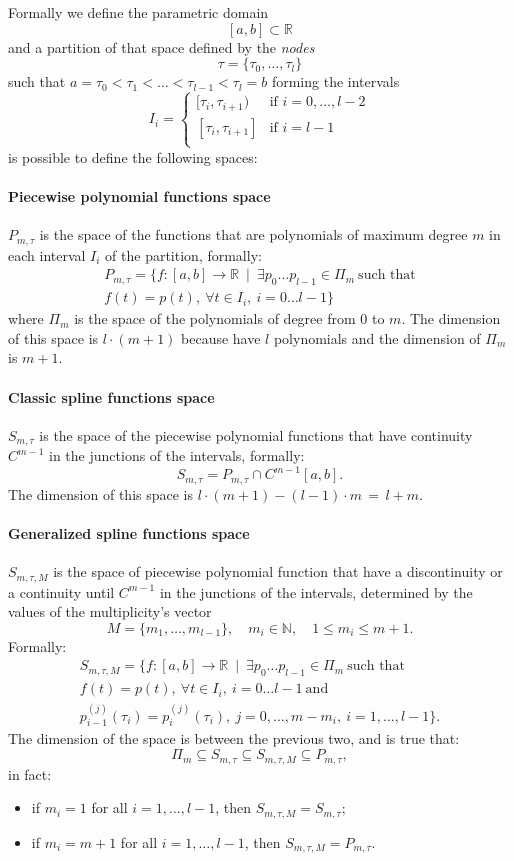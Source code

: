 \documentclass[a4paper]{article}
\newcommand{\mR}{\ensuremath{\mathbb{R}}}
\newcommand{\mN}{\ensuremath{\mathbb{N}}}
\begin{document}
Formally we define the parametric domain
$$[a,b]\subset\mR$$
and a partition of that space defined by the \emph{nodes}
$$\tau = \{\tau_0,\dots,\tau_l\}$$
such that $a=\tau_0<\tau_1<\dots<\tau_{l-1}<\tau_l=b$ forming the
intervals
$$
I_i=
\begin{cases}
  [\tau_i,\tau_{i+1}) & \mbox{if } i=0,\dots,l-2\\
    [\tau_i,\tau_{i+1}] & \mbox{if } i=l-1\\
\end{cases}
$$
is possible to define the following spaces:
\paragraph{Piecewise polynomial functions space} $P_{m,\tau}$
is the space of the functions that are polynomials of maximum degree $m$
in each interval $I_i$ of the partition, formally:
\begin{multline*}
  P_{m,\tau}=\{f:[a,b]\rightarrow\mR\ \mid\ \exists p_0\dots
  p_{l-1}\in\Pi_m \ \text{such that}\\
  f(t)=p(t),\ \forall t\in I_i,\
  i=0\dots l-1\}
\end{multline*}
where $\Pi_m$ is the space of the polynomials of degree from $0$ to
$m$. The dimension of this space is $l\cdot(m+1)$ because have $l$
polynomials and the dimension of $\Pi_m$ is $m+1$.
\paragraph{Classic spline functions space} $S_{m,\tau}$ is the space of
the piecewise polynomial functions that have continuity $C^{m-1}$ in
the junctions of the intervals, formally:
$$
S_{m,\tau}=P_{m,\tau}\cap C^{m-1}[a,b].
$$
The dimension of this space is $l\cdot(m+1)-(l-1)\cdot m\,=\,l+m$.
\paragraph{Generalized spline functions space} $S_{m,\tau,M}$ is the
space of piecewise polynomial function that have a discontinuity or a
continuity until $C^{m-1}$ in the junctions of the intervals,
determined by the values of the multiplicity's
vector
$$
M=\{m_1,\dots,m_{l-1}\},\quad m_i\in\mN,\quad 1\leq m_i\leq m+1.
$$
Formally:
\begin{multline*}
  S_{m,\tau,M}=\{f:[a,b]\rightarrow\mR\ \mid\ \exists p_0\dots
  p_{l-1}\in\Pi_m \ \text{such that}\\
  f(t)=p(t),\ \forall t\in I_i,\
  i=0\dots l-1\ \text{and}\\
  p_{i-1}^{(j)}(\tau_i)=p_{i}^{(j)}(\tau_i),\ j=0,\dots,m-m_i,\ i=1,\dots,l-1\}.
\end{multline*}
The dimension of the space is between the previous two, and is true
that:
$$
\Pi_m\subseteq S_{m,\tau}\subseteq S_{m,\tau,M}\subseteq P_{m,\tau},
$$
in fact:
\begin{itemize}
  \item if $m_i=1$ for all $i=1,\dots,l-1$, then
    $S_{m,\tau,M}=S_{m,\tau}$;
  \item if $m_i=m+1$ for all $i=1,\dots,l-1$, then
    $S_{m,\tau,M}=P_{m,\tau}$.
\end{itemize}
\end{document}

